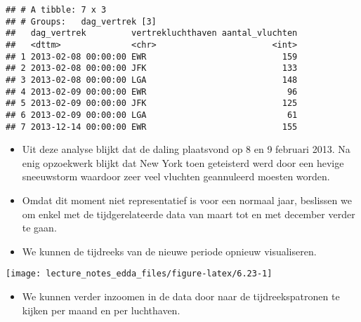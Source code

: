\documentclass[]{memoir}
\newenvironment{Shaded}{\begin{snugshade}}{\end{snugshade}}
\newcommand{\KeywordTok}[1]{\textcolor[rgb]{0.13,0.29,0.53}{\textbf{#1}}}
\newcommand{\DataTypeTok}[1]{\textcolor[rgb]{0.13,0.29,0.53}{#1}}
\newcommand{\StringTok}[1]{\textcolor[rgb]{0.31,0.60,0.02}{#1}}
\newcommand{\OperatorTok}[1]{\textcolor[rgb]{0.81,0.36,0.00}{\textbf{#1}}}
\newcommand{\NormalTok}[1]{#1}
\providecommand{\tightlist}{%
  \setlength{\itemsep}{0pt}\setlength{\parskip}{0pt}}
\begin{document}
\begin{verbatim}
## # A tibble: 7 x 3
## # Groups:   dag_vertrek [3]
##   dag_vertrek         vertrekluchthaven aantal_vluchten
##   <dttm>              <chr>                       <int>
## 1 2013-02-08 00:00:00 EWR                           159
## 2 2013-02-08 00:00:00 JFK                           133
## 3 2013-02-08 00:00:00 LGA                           148
## 4 2013-02-09 00:00:00 EWR                            96
## 5 2013-02-09 00:00:00 JFK                           125
## 6 2013-02-09 00:00:00 LGA                            61
## 7 2013-12-14 00:00:00 EWR                           155
\end{verbatim}

\begin{itemize}
\item
  Uit deze analyse blijkt dat de daling plaatsvond op 8 en 9 februari
  2013. Na enig opzoekwerk blijkt dat New York toen geteisterd werd door
  een hevige sneeuwstorm waardoor zeer veel vluchten geannuleerd moesten
  worden.
\item
  Omdat dit moment niet representatief is voor een normaal jaar,
  beslissen we om enkel met de tijdgerelateerde data van maart tot en
  met december verder te gaan.
\item
  We kunnen de tijdreeks van de nieuwe periode opnieuw visualiseren.
\end{itemize}

\texttt{[image: lecture\_notes\_edda\_files/figure-latex/6.23-1]}

\begin{itemize}
\tightlist
\item
  We kunnen verder inzoomen in de data door naar de tijdreekspatronen te
  kijken per maand en per luchthaven.
\end{itemize}

\begin{Shaded}
\end{Shaded}
\end{document}
